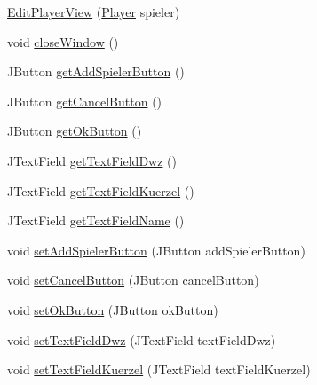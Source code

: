 \begin{DoxyCompactItemize}
\item 
\hyperlink{classde_1_1turnierverwaltung_1_1view_1_1_edit_player_view_a63d9a2c49c33f68029e78cb39fd6a0ef}{Edit\+Player\+View} (\hyperlink{classde_1_1turnierverwaltung_1_1model_1_1_player}{Player} spieler)
\item 
void \hyperlink{classde_1_1turnierverwaltung_1_1view_1_1_edit_player_view_a42da481d3ae4454e9e3b5aa6c27e4304}{close\+Window} ()
\item 
J\+Button \hyperlink{classde_1_1turnierverwaltung_1_1view_1_1_edit_player_view_ab5d5ac23fd7addbf521efd75675a4961}{get\+Add\+Spieler\+Button} ()
\item 
J\+Button \hyperlink{classde_1_1turnierverwaltung_1_1view_1_1_edit_player_view_a9d80256d9a2dba60702df30cfca1f2f9}{get\+Cancel\+Button} ()
\item 
J\+Button \hyperlink{classde_1_1turnierverwaltung_1_1view_1_1_edit_player_view_a4fdf5b34e6e0bdc776d902c6844f57a6}{get\+Ok\+Button} ()
\item 
J\+Text\+Field \hyperlink{classde_1_1turnierverwaltung_1_1view_1_1_edit_player_view_a3a664a821feaf55d0bea11fe18b1fff6}{get\+Text\+Field\+Dwz} ()
\item 
J\+Text\+Field \hyperlink{classde_1_1turnierverwaltung_1_1view_1_1_edit_player_view_aabb666d83a7c9152a0449edd4215594c}{get\+Text\+Field\+Kuerzel} ()
\item 
J\+Text\+Field \hyperlink{classde_1_1turnierverwaltung_1_1view_1_1_edit_player_view_a9ab507fce902ba29ce7abcee2e2c67ef}{get\+Text\+Field\+Name} ()
\item 
void \hyperlink{classde_1_1turnierverwaltung_1_1view_1_1_edit_player_view_a9765077a804f46268e0f653f3e128c8d}{set\+Add\+Spieler\+Button} (J\+Button add\+Spieler\+Button)
\item 
void \hyperlink{classde_1_1turnierverwaltung_1_1view_1_1_edit_player_view_aa1f621faf896646a213c55f1d5298a75}{set\+Cancel\+Button} (J\+Button cancel\+Button)
\item 
void \hyperlink{classde_1_1turnierverwaltung_1_1view_1_1_edit_player_view_aaf471fac4aad281962032dcfa0b05ac6}{set\+Ok\+Button} (J\+Button ok\+Button)
\item 
void \hyperlink{classde_1_1turnierverwaltung_1_1view_1_1_edit_player_view_ad1477bc3a06c863b0723876d00597031}{set\+Text\+Field\+Dwz} (J\+Text\+Field text\+Field\+Dwz)
\item 
void \hyperlink{classde_1_1turnierverwaltung_1_1view_1_1_edit_player_view_af19cd346b703c304b761dc0243cac364}{set\+Text\+Field\+Kuerzel} (J\+Text\+Field text\+Field\+Kuerzel)

\end{DoxyCompactItemize}
